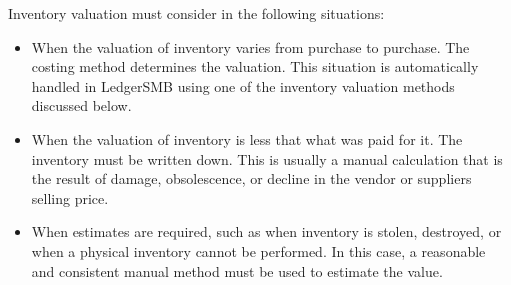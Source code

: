 Inventory valuation must consider in the following situations:
\begin{itemize}
        \item When the valuation of inventory varies from purchase to purchase. The costing method
        determines the valuation.  This situation is automatically handled in LedgerSMB using one of the
        inventory valuation methods discussed below.
        \item When the valuation of inventory is less that what was paid for it. The inventory must
        be written down. This is usually a manual calculation that is the result of damage, obsolescence, 
        or decline in the vendor or suppliers selling price.
        \item When estimates are required, such as when inventory is stolen, destroyed, or when a physical inventory
        cannot be performed. In this case, a reasonable and consistent manual method must be used to 
        estimate the value. 
\end{itemize}

